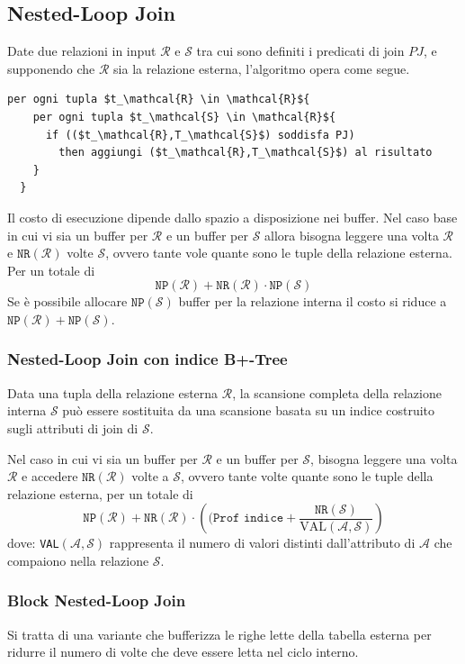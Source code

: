 \documentclass[oneside,a4paper,11pt]{book}
\theoremstyle{italicstyle}
\theoremstyle{normStyle}
\begin{document}
\subsection{Nested-Loop Join}
Date due relazioni in input $\mathcal{R}$ e $\mathcal{S}$ tra cui sono definiti i predicati di join 
$PJ$, e supponendo che $\mathcal{R}$ sia la relazione esterna, l'algoritmo opera come segue.
\begin{lstlisting}[mathescape]
  per ogni tupla $t_\mathcal{R} \in \mathcal{R}${
    per ogni tupla $t_\mathcal{S} \in \mathcal{R}${
      if (($t_\mathcal{R},T_\mathcal{S}$) soddisfa PJ)
        then aggiungi ($t_\mathcal{R},T_\mathcal{S}$) al risultato
    }
  }
\end{lstlisting}
Il costo di esecuzione dipende dallo spazio a disposizione nei buffer.
Nel caso base in cui vi sia un buffer per $\mathcal{R}$ e un buffer per $\mathcal{S}$
allora bisogna leggere una volta $\mathcal{R}$ e $\texttt{NR}(\mathcal{R})$ volte $\mathcal{S}$,
ovvero tante vole quante sono le tuple della relazione esterna.
Per un totale di 
\[
  \texttt{NP}(\mathcal{R}) + \texttt{NR}(\mathcal{R}) \cdot \texttt{NP}(\mathcal{S})
\]
Se è possibile allocare $\texttt{NP}(\mathcal{S})$ buffer per la relazione interna il costo si riduce a 
$\texttt{NP}(\mathcal{R}) + \texttt{NP}(\mathcal{S})$.
\subsubsection{Nested-Loop Join con indice B+-Tree}
Data una tupla della relazione esterna $\mathcal{R}$, la scansione completa della relazione interna 
$\mathcal{S}$ può essere sostituita da una scansione basata su un indice costruito sugli attributi 
di join di $\mathcal{S}$.

Nel caso in cui vi sia un buffer per $\mathcal{R}$ e un buffer per $\mathcal{S}$, bisogna 
leggere una volta $\mathcal{R}$ e accedere $\texttt{NR}(\mathcal{R})$ volte a $\mathcal{S}$, 
ovvero tante volte quante sono le tuple della relazione esterna, per un totale di 
\[
  \texttt{NP}(\mathcal{R}) + \texttt{NR}(\mathcal{R}) \cdot \left((\texttt{Prof indice} + \frac{\texttt{NR}(\mathcal{S})}{\text{VAL}(\mathcal{A}, \mathcal{S})}\right)
\]
dove: \verb|VAL|$(\mathcal{A}, \mathcal{S})$ rappresenta il numero di valori distinti dall'attributo di $\mathcal{A}$
che compaiono nella relazione $\mathcal{S}$.
\subsubsection{Block Nested-Loop Join}
Si tratta di una variante che bufferizza le righe lette della tabella esterna per ridurre il numero 
di volte che deve essere letta nel ciclo interno.
\end{document}
